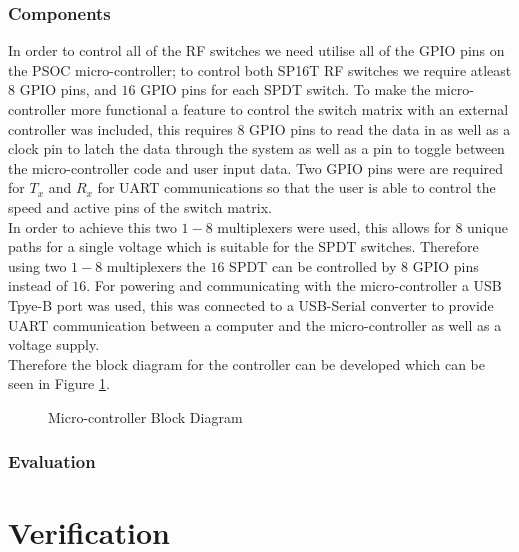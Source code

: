 \documentclass[12pt,openany,a4paper]{book}
\begin{document}
\subsection{Components}
In order to control all of the RF switches we need utilise all of the GPIO pins on the PSOC micro-controller; to control both SP16T RF switches we require atleast $8$ GPIO pins, and $16$ GPIO pins for each SPDT switch. To make the micro-controller more functional a feature to control the switch matrix with an external controller was included, this requires $8$ GPIO pins to read the data in as well as a clock pin to latch the data through the system as well as a pin to toggle between the micro-controller code and user input data. Two GPIO pins were are required for $T_x$ and $R_x$ for UART communications so that the user is able to control the speed and active pins of the switch matrix.\\[0.2cm] 
In order to achieve this two $1-8$ multiplexers were used, this allows for $8$ unique paths for a single voltage which is suitable for the SPDT switches. Therefore using two $1-8$ multiplexers the $16$ SPDT can be controlled by $8$ GPIO pins instead of $16$. For powering and communicating with the micro-controller a USB Tpye-B port was used, this was connected to a USB-Serial converter to provide UART communication between a computer and the micro-controller as well as a voltage supply.\\[0.2cm]
Therefore the block diagram for the controller can be developed which can be seen in Figure \ref{fig:micro-block}.
\begin{figure}[H]
	\centering
	\caption{Micro-controller Block Diagram}
	\label{fig:micro-block}
\end{figure} 


\subsection{Evaluation}











\chapter{Verification}		\label{chap:verification}
\end{document}
